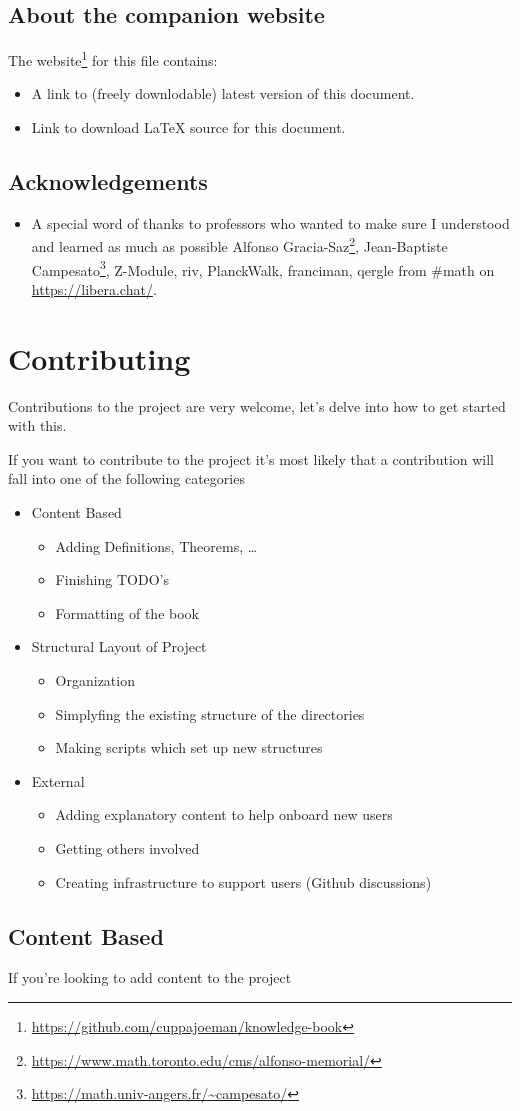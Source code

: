 \section*{About the companion website}
The website\footnote{\url{https://github.com/cuppajoeman/knowledge-book}} for this file contains:
\begin{itemize}
  \item A link to (freely downlodable) latest version of this document.
  \item Link to download LaTeX source for this document.
\end{itemize}

\section*{Acknowledgements}
\begin{itemize}
    \item A special word of thanks to professors who wanted to make sure I understood and learned as much as possible Alfonso Gracia-Saz\footnote{\url{https://www.math.toronto.edu/cms/alfonso-memorial/}}, Jean-Baptiste Campesato\footnote{\url{https://math.univ-angers.fr/~campesato/}}, Z-Module, riv, PlanckWalk, franciman, qergle from \#math on \url{https://libera.chat/}.
\end{itemize}

\chapter*{Contributing}
 
Contributions to the project are very welcome, let's delve into how to get started with this.

If you want to contribute to the project it's most likely that a contribution will fall into one of the following categories
\begin{itemize}
  \item Content Based 
  \begin{itemize}
      \item Adding Definitions, Theorems, \ldots
      \item Finishing TODO's
      \item Formatting of the book
  \end{itemize}
  \item Structural Layout of Project 
  \begin{itemize}
      \item Organization
      \item Simplyfing the existing structure of the directories 
      \item Making scripts which set up new structures
  \end{itemize}
  \item External
  \begin{itemize}
      \item Adding explanatory content to help onboard new users
      \item Getting others involved
      \item Creating infrastructure to support users (Github discussions)
  \end{itemize}
\end{itemize}

\section*{Content Based}

If you're looking to add content to the project  %
